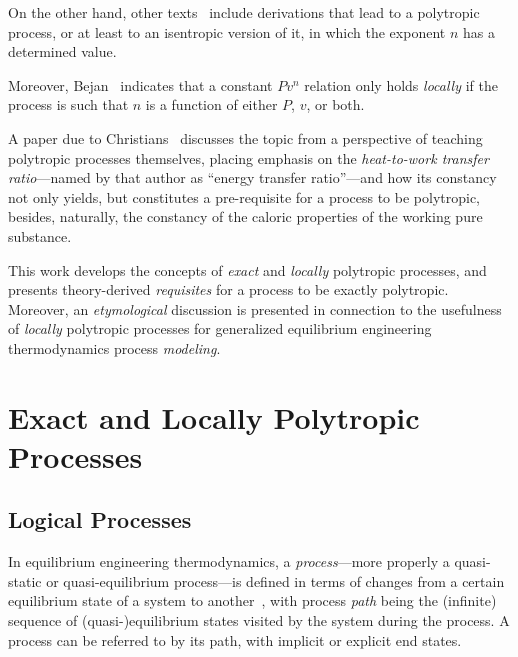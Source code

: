 \documentclass[fleqn,11pt]{SelfArx}
\begin{document}
    On  the  other  hand,  other  texts~\cite{1986-JonesJB+HawkinsGA-Wiley,   2006-BejanA-Wiley,
    2015-KroosKA+PotterMC-Cengage} include derivations that lead to a polytropic process, or  at
    least to an isentropic version of it, in which the exponent $n$ has a determined value.

    Moreover, Bejan~\cite[p.~175]{2006-BejanA-Wiley} indicates that a constant  $Pv^n$  relation
    only holds \emph{locally} if the process is such that $n$ is a function of either $P$,  $v$,
    or both.

    A paper due to Christians~\cite{2012-ChristiansJ-IntJMechEngEduc} discusses the topic from a
    perspective  of  teaching  polytropic  processes  themselves,  placing   emphasis   on   the
    \emph{heat-to-work transfer ratio}---named by that author as ``energy transfer ratio''---and
    how its constancy not only yields, but constitutes a  pre-requisite  for  a  process  to  be
    polytropic, besides, naturally, the constancy of the caloric properties of the working  pure
    substance.

    This work develops the concepts of \emph{exact} and \emph{locally} polytropic processes, and
    presents theory-derived \emph{requisites} for a process to be exactly polytropic.  Moreover,
    an  \emph{etymological}  discussion  is  presented  in  connection  to  the  usefulness   of
    \emph{locally} polytropic processes for generalized equilibrium  engineering  thermodynamics
    process \emph{modeling}.

\section{Exact and Locally Polytropic Processes}

    \subsection{Logical Processes}

    In equilibrium engineering thermodynamics, a \emph{process}---more properly  a  quasi-static
    or quasi-equilibrium process---is defined in terms of changes  from  a  certain  equilibrium
    state of a system to  another~\cite{2013-CengelYA+BolesMA-AMGH},  with  process  \emph{path}
    being the (infinite) sequence of (quasi-)equilibrium states visited by the system during the
    process. A process can be referred to by its path, with implicit or explicit end states.
\end{document}
